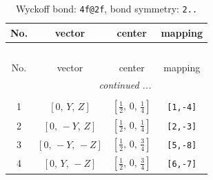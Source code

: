 \documentclass[fleqn,8pt]{jsarticle}
\begin{document}
\renewcommand{\arraystretch}{1.2}
\begin{longtable}{cccc}
\caption{Wyckoff bond: {\tt 4f@2f}, bond symmetry: {\tt 2..}}
 \\
 \hline \hline
No. & vector & center & mapping \\ \hline \endfirsthead

\multicolumn{3}{l}{\tablename\ \thetable{}} \\
 \hline \hline
No. & vector & center & mapping \\ \hline \endhead

 \hline \hline
\multicolumn{3}{r}{\footnotesize\it continued ...} \\ \endfoot

 \hline \hline
\multicolumn{3}{r}{} \\ \endlastfoot

1 & $\left[ 0,\, Y,\, Z \right]$ & $\left[ \frac{1}{2},\, 0,\, \frac{1}{4} \right]$ & {\tt [1,-4]} \\ \hline
2 & $\left[ 0,\, - Y,\, Z \right]$ & $\left[ \frac{1}{2},\, 0,\, \frac{1}{4} \right]$ & {\tt [2,-3]} \\ \hline
3 & $\left[ 0,\, - Y,\, - Z \right]$ & $\left[ \frac{1}{2},\, 0,\, \frac{3}{4} \right]$ & {\tt [5,-8]} \\ \hline
4 & $\left[ 0,\, Y,\, - Z \right]$ & $\left[ \frac{1}{2},\, 0,\, \frac{3}{4} \right]$ & {\tt [6,-7]} \\
\end{longtable}
\renewcommand{\arraystretch}{1.2}
\end{document}
